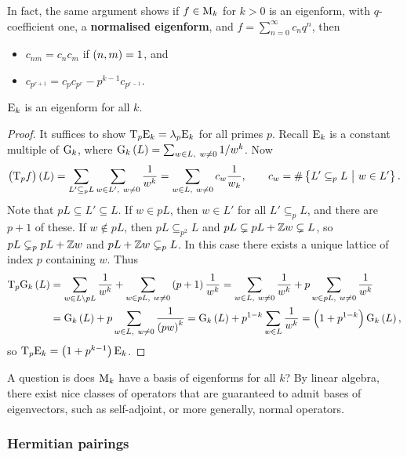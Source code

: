 In fact, the same argument shows if $ f \in \mathrm{M}_k $ for $ k > 0 $ is an eigenform, with $ q $-coefficient one, a \textbf{normalised eigenform}, and $ f = \sum_{n = 0}^\infty c_nq^n $, then
\begin{itemize}
\item $ c_{nm} = c_nc_m $ if $ \br{n, m} = 1 $, and
\item $ c_{p^{r + 1}} = c_pc_{p^r} - p^{k - 1}c_{p^{r - 1}} $.
\end{itemize}

\begin{proposition}
$ \mathrm{E}_k $ is an eigenform for all $ k $.
\end{proposition}

\begin{proof}
It suffices to show $ \mathrm{T}_p\mathrm{E}_k = \lambda_p\mathrm{E}_k $ for all primes $ p $. Recall $ \mathrm{E}_k $ is a constant multiple of $ \mathrm{G}_k $, where $ \G_k\br{L} = \sum_{w \in L, \ w \ne 0} 1 / w^k $. Now
$$ \br{\T_pf}\br{L} = \sum_{L' \subseteq_p L} \sum_{w \in L', \ w \ne 0} \dfrac{1}{w^k} = \sum_{w \in L, \ w \ne 0} c_w\dfrac{1}{w_k}, \qquad c_w = \#\cbr{L' \subseteq_p L \st w \in L'}. $$
Note that $ pL \subseteq L' \subseteq L $. If $ w \in pL $, then $ w \in L' $ for all $ L' \subseteq_p L $, and there are $ p + 1 $ of these. If $ w \notin pL $, then $ pL \subseteq_{p^2} L $ and $ pL \subsetneq pL + \mathbb{Z} w \subsetneq L $, so $ pL \subsetneq_p pL + \mathbb{Z} w $ and $ pL + \mathbb{Z} w \subsetneq_p L $. In this case there exists a unique lattice of index $ p $ containing $ w $. Thus
\begin{align*}
\T_p\G_k\br{L}
& = \sum_{w \in L \setminus pL} \dfrac{1}{w^k} + \sum_{w \in pL, \ w \ne 0} \br{p + 1}\dfrac{1}{w^k}
= \sum_{w \in L, \ w \ne 0} \dfrac{1}{w^k} + p\sum_{w \in pL, \ w \ne 0} \dfrac{1}{w^k} \\
& = \G_k\br{L} + p\sum_{w \in L, \ w \ne 0} \dfrac{1}{\br{pw}^k}
= \G_k\br{L} + p^{1 - k}\sum_{w \in L} \dfrac{1}{w^k}
= \br{1 + p^{1 - k}}\G_k\br{L},
\end{align*}
so $ \T_p\E_k = \br{1 + p^{k - 1}}\E_k $.
\end{proof}

A question is does $ \mathrm{M}_k $ have a basis of eigenforms for all $ k $? By linear algebra, there exist nice classes of operators that are guaranteed to admit bases of eigenvectors, such as self-adjoint, or more generally, normal operators.

\pagebreak

\subsubsection{Hermitian pairings}

